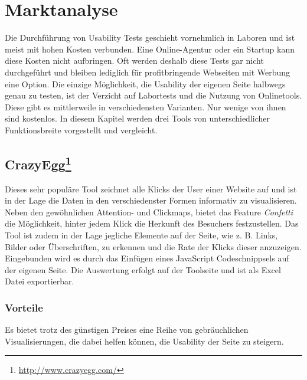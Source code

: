 %
%
%
%

\section{Marktanalyse}

Die Durchführung von Usability Tests geschieht vornehmlich in Laboren und ist meist mit hohen Kosten verbunden. Eine Online-Agentur oder ein Startup kann diese Kosten nicht aufbringen. Oft werden deshalb diese Tests gar nicht durchgeführt und bleiben lediglich für profitbringende Webseiten mit Werbung eine Option. Die einzige Möglichkeit, die Usability der eigenen Seite halbwegs genau zu testen, ist der Verzicht auf Labortests und die Nutzung von Onlinetools. Diese gibt es mittlerweile in verschiedensten Varianten. Nur wenige von ihnen sind kostenlos. In diesem Kapitel werden drei Tools von unterschiedlicher Funktionsbreite vorgestellt und vergleicht.

\subsection*{CrazyEgg\footnote{\url{http://www.crazyegg.com/}}}

Dieses sehr populäre Tool zeichnet alle Klicks der User einer Website auf und ist in der Lage die Daten in den verschiedenster Formen informativ zu visualisieren. Neben den gewöhnlichen Attention- und Clickmaps, bietet das Feature \textit{Confetti} die Möglichkeit, hinter jedem Klick die Herkunft des Besuchers festzustellen. Das Tool ist zudem in der Lage jegliche Elemente auf der Seite, wie z. B. Links, Bilder oder Überschriften, zu erkennen und die Rate der Klicks dieser anzuzeigen. Eingebunden wird es durch das Einfügen eines JavaScript Codeschnippsels auf der eigenen Seite. Die Auswertung erfolgt auf der Toolseite und ist als Excel Datei exportierbar.

\subsubsection*{Vorteile}
Es bietet trotz des günstigen Preises eine Reihe von gebräuchlichen Visualisierungen, die dabei helfen können, die Usability der Seite zu steigern.

